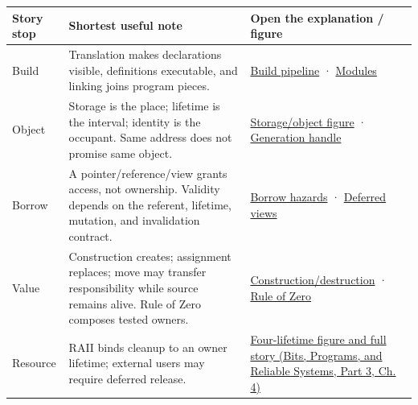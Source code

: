 {\def\LTcaptype{none} %
\begin{longtable}[]{@{}
  >{\raggedright\arraybackslash}p{}
  >{\raggedright\arraybackslash}p{}
  >{\raggedright\arraybackslash}p{}@{}}
\toprule\noalign{}
\begin{minipage}[b]{\linewidth}\raggedright
Story stop
\end{minipage} & \begin{minipage}[b]{\linewidth}\raggedright
Shortest useful note
\end{minipage} & \begin{minipage}[b]{\linewidth}\raggedright
Open the explanation / figure
\end{minipage} \\
\midrule\noalign{}
\endhead
\bottomrule\noalign{}
\endlastfoot
Build & Translation makes declarations visible, definitions executable, and linking joins program pieces. & \hyperref[01-foundations-i-ch002-the-journey-from-text-to-a-live-object]{Build pipeline} · \hyperref[01-foundations-i-ch002-a-compiled-interface-rather-than-repeated-text]{Modules} \\
Object & Storage is the place; lifetime is the interval; identity is the occupant. Same address does not promise same object. & \hyperref[01-foundations-i-ch002-storage-is-a-place-an-object-is-its-occupant]{Storage/object figure} · \hyperref[01-foundations-i-ch002-a-handle-remembers-which-occupant-was-intended]{Generation handle} \\
Borrow & A pointer/reference/view grants access, not ownership. Validity depends on the referent, lifetime, mutation, and invalidation contract. & \hyperref[01-foundations-i-ch003-when-a-valid-borrow-stops-naming-the-intended-thing]{Borrow hazards} · \hyperref[01-foundations-i-ch003-borrowed-views-and-deferred-work-need-an-owner-story]{Deferred views} \\
Value & Construction creates; assignment replaces; move may transfer responsibility while source remains alive. Rule of Zero composes tested owners. & \hyperref[01-foundations-i-ch003-construction-establishes-a-usable-state]{Construction/destruction} · \hyperref[01-foundations-i-ch003-from-three-repairs-to-five-decisions-to-zero-boilerplate]{Rule of Zero} \\
Resource & RAII binds cleanup to an owner lifetime; external users may require deferred release. & \href{../01-Bits-Programs-and-Reliable-Systems-P03/main.pdf\#nameddest=01-foundations-i-ch004-from-a-live-object-to-responsible-resource-ownership}{Four-lifetime figure and full story (Bits, Programs, and Reliable Systems, Part 3, Ch. 4)} \\

\end{longtable}}
